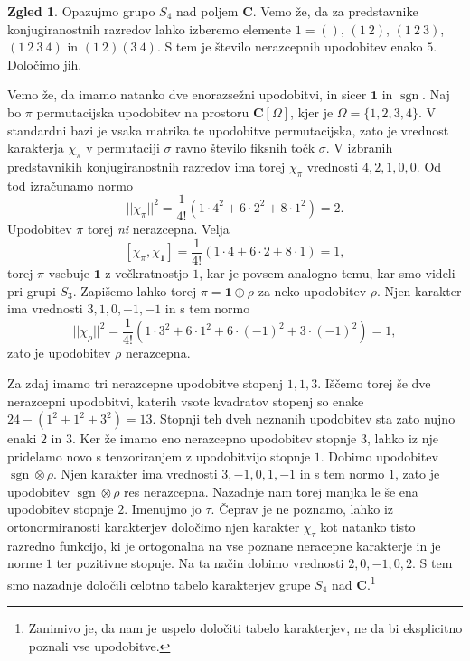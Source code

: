 \documentclass[11pt]{book}
\def\CC{\mathbf{C}}
\def\oneone{\mathbf{1}}
\DeclareMathOperator\sgn{sgn}
\theoremstyle{definition}
\theoremstyle{zgled}
\newtheorem{zgled}[theorem]{Zgled}
\theoremstyle{zgledbrezstevilke}
\theoremstyle{odprtproblem}
\theoremstyle{domacanaloga}
\theoremstyle{izrek}
\begin{document}
\begin{zgled}
Opazujmo grupo $S_4$ nad poljem $\CC$. Vemo že, da za predstavnike konjugiranostnih razredov lahko izberemo elemente $1 = ()$, $(1 \ 2)$, $(1 \ 2 \ 3)$, $(1 \ 2 \ 3 \ 4)$ in $(1 \ 2)(3 \ 4)$. S tem je število nerazcepnih upodobitev enako $5$. Določimo jih. 

Vemo že, da imamo natanko dve enorazsežni upodobitvi, in sicer $\oneone$ in $\sgn$. Naj bo $\pi$ permutacijska upodobitev na prostoru $\CC[\Omega]$, kjer je $\Omega = \{ 1,2,3,4 \}$. V standardni bazi je vsaka matrika te upodobitve permutacijska, zato je vrednost karakterja $\chi_{\pi}$ v permutaciji $\sigma$ ravno število fiksnih točk $\sigma$. V izbranih predstavnikih konjugiranostnih razredov ima torej $\chi_{\pi}$ vrednosti $4, 2, 1, 0, 0$. Od tod izračunamo normo
\[
    ||\chi_{\pi}||^2 = \frac{1}{4!} \left( 1 \cdot 4^2 + 6 \cdot 2^2 + 8 \cdot 1^2  \right)
    = 2.
\]
Upodobitev $\pi$ torej \emph{ni} nerazcepna. Velja
\[
    [ \chi_{\pi}, \chi_{\oneone} ] = \frac{1}{4!} \left( 1 \cdot 4 + 6 \cdot 2 + 8 \cdot 1 \right) = 1,
\]
torej $\pi$ vsebuje $\oneone$ z večkratnostjo $1$, kar je povsem analogno temu, kar smo videli pri grupi $S_3$. Zapišemo lahko torej $\pi = \oneone \oplus \rho$ za neko upodobitev $\rho$. Njen karakter ima vrednosti $3,1,0,-1,-1$ in s tem normo
\[
    ||\chi_{\rho}||^2 = \frac{1}{4!} \left( 1 \cdot 3^2 + 6 \cdot 1^2 + 6 \cdot (-1)^2 + 3 \cdot (-1)^2 \right) = 1,
\]
zato je upodobitev $\rho$ nerazcepna. 

Za zdaj imamo tri nerazcepne upodobitve stopenj $1,1,3$. Iščemo torej še dve nerazcepni upodobitvi, katerih vsote kvadratov stopenj so enake $24 - (1^2 + 1^2 + 3^2) = 13$. Stopnji teh dveh neznanih upodobitev sta zato nujno enaki $2$ in $3$. Ker že imamo eno nerazcepno upodobitev stopnje $3$, lahko iz nje pridelamo novo s tenzoriranjem z upodobitvijo stopnje $1$. Dobimo upodobitev $\sgn \otimes \rho$. Njen karakter ima vrednosti $3,-1,0,1,-1$ in s tem normo $1$, zato je upodobitev $\sgn \otimes \rho$ res nerazcepna. Nazadnje nam torej manjka le še ena upodobitev stopnje $2$. Imenujmo jo $\tau$. Čeprav je ne poznamo, lahko iz ortonormiranosti karakterjev določimo njen karakter $\chi_{\tau}$ kot natanko tisto razredno funkcijo, ki je ortogonalna na vse poznane neracepne karakterje in je norme $1$ ter pozitivne stopnje. Na ta način dobimo vrednosti $2,0,-1,0,2$. S tem smo nazadnje določili celotno tabelo karakterjev grupe $S_4$ nad $\CC$.\footnote{Zanimivo je, da nam je uspelo določiti tabelo karakterjev, ne da bi eksplicitno poznali vse upodobitve. }


\end{zgled}
\end{document}
